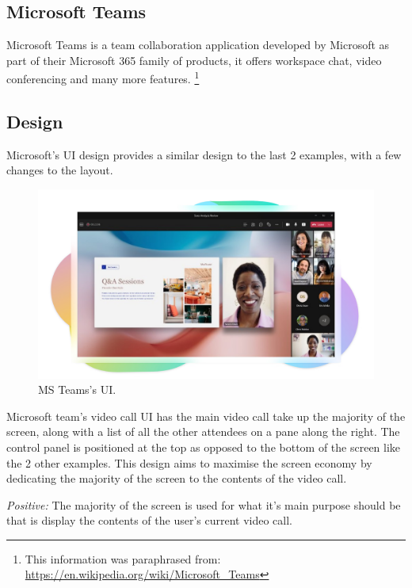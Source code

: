\subsection{Microsoft Teams}

Microsoft Teams is a team collaboration application developed by
Microsoft as part of their Microsoft 365 family of products, it offers
workspace chat, video conferencing and many more features.
\footnote{This information was paraphrased from:
\url{https://en.wikipedia.org/wiki/Microsoft_Teams}}

\subsection*{Design}

Microsoft's UI design provides a similar design to the last
2 examples, with a few changes to the layout.

\begin{figure}[H]

\centering
\includegraphics[scale=0.12]{Images/MSTeams.png}

\caption{MS Teams's UI.}
\label{fig:Teams}

\end{figure}

Microsoft team's video call UI has the main video call take up the
majority of the screen, along with a list of all the other
attendees on a pane along the right. The control panel is
positioned at the top as opposed to the bottom of the screen like
the 2 other examples. This design aims to maximise the screen economy
by dedicating the majority of the screen to the contents of the
video call. \\ \vspace{0.2cm}

\textit{Positive:} The majority of the screen is used for what it's
main purpose should be that is display the contents of the user's
current video call.
\\ \vspace{0.2cm}

